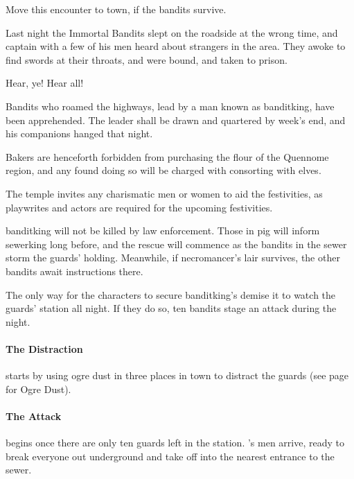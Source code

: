\begin{multicols}{2}

\banditking

Move this encounter to town, if the bandits survive.

\resumecontents[Town]


\stopcontents[Town]

Last night the Immortal Bandits slept on the roadside at the wrong time, and \gls{captain} with a few of his men heard about strangers in the area.
They awoke to find swords at their throats, and were bound, and taken to prison.

\begin{boxtext}

	Hear, ye!  Hear all!

	Bandits who roamed the highways, lead by a man known as \gls{banditking}, have been apprehended.  The leader shall be drawn and quartered by week's end, and his companions hanged that night.

	Bakers are henceforth forbidden from purchasing the flour of the Quennome region, and any found doing so will be charged with consorting with elves.

	The temple invites any charismatic men or women to aid the festivities, as playwrites and actors are required for the upcoming festivities.

\end{boxtext}

\Gls{banditking} will not be killed by law enforcement.
Those in \gls{pig} will inform \gls{sewerking} long before, and the rescue will commence as the bandits in the sewer storm the guards' holding.
Meanwhile, if \gls{necromancer}'s lair survives, the other bandits await instructions there.

The only way for the characters to secure \gls{banditking}'s demise it to watch the guards' station all night.
If they do so, ten bandits stage an attack during the night.

\paragraph{The Distraction} starts by using ogre dust in three places in town to distract the guards (see page \pageref{ogredust} for Ogre Dust).

\paragraph{The Attack}
begins once there are only ten guards left in the station.
's men arrive, ready to break everyone out underground and take off into the nearest entrance to the sewer.


\end{multicols}

